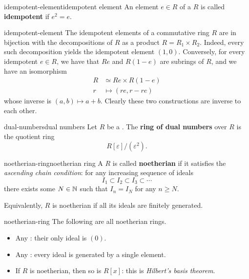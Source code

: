 \begin{topic}{idempotent-element}{idempotent element}
    An element $e \in R$ of a  $R$ is called \textbf{idempotent} if $e^2 = e$.
\end{topic}

\begin{example}{idempotent-element}
    The idempotent elements of a commutative ring $R$ are in bijection with the decompositions of $R$ as a product $R = R_1 \times R_2$. Indeed, every such decomposition yields the idempotent element $(1, 0)$. Conversely, for every idempotent $e \in R$, we have that $Re$ and $R(1 - e)$ are subrings of $R$, and we have an isomorphism
    \[ \begin{aligned}
        R &\simeq Re \times R(1 - e) \\
        r &\mapsto (re, r - re)
    \end{aligned} \]
    whose inverse is $(a, b) \mapsto a + b$. Clearly these two constructions are inverse to each other.
\end{example}

\begin{topic}{dual-numbers}{dual numbers}
    Let $R$ be a . The \textbf{ring of dual numbers} over $R$ is the quotient ring
    \[ R[\varepsilon] / (\varepsilon^2) . \]
\end{topic}

\begin{topic}{noetherian-ring}{noetherian ring}
    A  $R$ is called \textbf{noetherian} if it satisfies the \textit{ascending chain condition}: for any increasing sequence of ideals
    \[ I_1 \subset I_2 \subset I_3 \subset \cdots \]
    there exists some $N \in \mathbb{N}$ such that $I_n = I_N$ for any $n \ge N$.
    
    Equivalently, $R$ is noetherian if all its ideals are finitely generated.
\end{topic}

\begin{example}{noetherian-ring}
    The following are all noetherian rings.
    \begin{itemize}
        \item Any : their only ideal is $(0)$.
        \item Any : every ideal is generated by a single element.
        \item If $R$ is noetherian, then so is $R[x]$: this is \textit{Hilbert's basis theorem}.
    \end{itemize}
\end{example}

